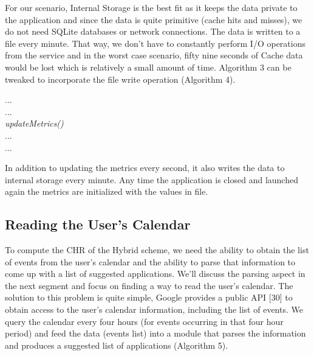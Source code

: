 \documentclass[12pt]{uthesis-v12}  %
\begin{document}
			For our scenario, Internal Storage is the best fit as it keeps the data private to the application and since the data is quite primitive (cache hits and misses), we do not need SQLite databases or network connections. The data is written to a file every minute. That way, we don't have to constantly perform I/O operations from the service and in the worst case scenario, fifty nine seconds of Cache data would be lost which is relatively a small amount of time. Algorithm 3 can be tweaked to incorporate the file write operation (Algorithm 4).
			
			\begin{algorithm}[H]
				\SetAlgoLined
				
				{	
					...\\
					...\\
					{\em updateMetrics()}\\
					...\\
					...\\	
				}
				
				\caption[Modified Update Metrics Algorithm]{In addition to updating the metrics every second, it also writes the data to internal storage every minute. Any time the application is closed and launched again the metrics are initialized with the values in file.}
			\end{algorithm}
			
		\subsection{Reading the User's Calendar}
			To compute the CHR of the Hybrid scheme, we need the ability to obtain the list of events from the user's calendar and the ability to parse that information to come up with a list of suggested applications. We'll discuss the parsing aspect in the next segment and focus on finding a way to read the user's calendar. The solution to this problem is quite simple, Google provides a public API [30] to obtain access to the user's calendar information, including the list of events. We query the calendar every four hours (for events occurring in that four hour period) and feed the data (events list) into a module that parses the information and produces a suggested list of applications (Algorithm 5). 
			
\end{document}

